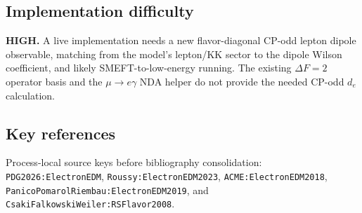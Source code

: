 \subsection*{Implementation difficulty}
\textbf{HIGH.}  A live implementation needs a new flavor-diagonal CP-odd
lepton dipole observable, matching from the model's lepton/KK sector to the
dipole Wilson coefficient, and likely SMEFT-to-low-energy running.  The
existing \(\Delta F=2\) operator basis and the \(\mu\to e\gamma\) NDA helper
do not provide the needed CP-odd \(d_e\) calculation.

\subsection*{Key references}
Process-local source keys before bibliography consolidation:
\texttt{PDG2026:ElectronEDM}, \texttt{Roussy:ElectronEDM2023},
\texttt{ACME:ElectronEDM2018},
\texttt{PanicoPomarolRiembau:ElectronEDM2019}, and
\texttt{CsakiFalkowskiWeiler:RSFlavor2008}.
